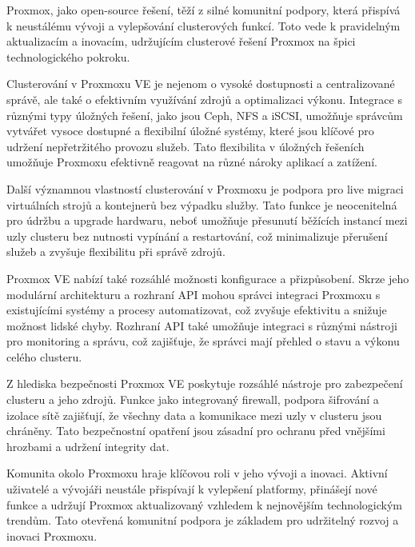 Proxmox, jako open-source řešení, těží z silné komunitní podpory, která přispívá k neustálému vývoji a vylepšování clusterových funkcí. Toto vede k pravidelným aktualizacím a inovacím, udržujícím clusterové řešení Proxmox na špici technologického pokroku.

Clusterování v Proxmoxu VE je nejenom o vysoké dostupnosti a centralizované správě, ale také o efektivním využívání zdrojů a optimalizaci výkonu. Integrace s různými typy úložných řešení, jako jsou Ceph, NFS a iSCSI, umožňuje správcům vytvářet vysoce dostupné a flexibilní úložné systémy, které jsou klíčové pro udržení nepřetržitého provozu služeb. Tato flexibilita v úložných řešeních umožňuje Proxmoxu efektivně reagovat na různé nároky aplikací a zatížení.

Další významnou vlastností clusterování v Proxmoxu je podpora pro live migraci virtuálních strojů a kontejnerů bez výpadku služby. Tato funkce je neocenitelná pro údržbu a upgrade hardwaru, neboť umožňuje přesunutí běžících instancí mezi uzly clusteru bez nutnosti vypínání a restartování, což minimalizuje přerušení služeb a zvyšuje flexibilitu při správě zdrojů.

Proxmox VE nabízí také rozsáhlé možnosti konfigurace a přizpůsobení. Skrze jeho modulární architekturu a rozhraní API mohou správci integraci Proxmoxu s existujícími systémy a procesy automatizovat, což zvyšuje efektivitu a snižuje možnost lidské chyby. Rozhraní API také umožňuje integraci s různými nástroji pro monitoring a správu, což zajišťuje, že správci mají přehled o stavu a výkonu celého clusteru.

Z hlediska bezpečnosti Proxmox VE poskytuje rozsáhlé nástroje pro zabezpečení clusteru a jeho zdrojů. Funkce jako integrovaný firewall, podpora šifrování a izolace sítě zajišťují, že všechny data a komunikace mezi uzly v clusteru jsou chráněny. Tato bezpečnostní opatření jsou zásadní pro ochranu před vnějšími hrozbami a udržení integrity dat.

Komunita okolo Proxmoxu hraje klíčovou roli v jeho vývoji a inovaci. Aktivní uživatelé a vývojáři neustále přispívají k vylepšení platformy, přinášejí nové funkce a udržují Proxmox aktualizovaný vzhledem k nejnovějším technologickým trendům. Tato otevřená komunitní podpora je základem pro udržitelný rozvoj a inovaci Proxmoxu.
